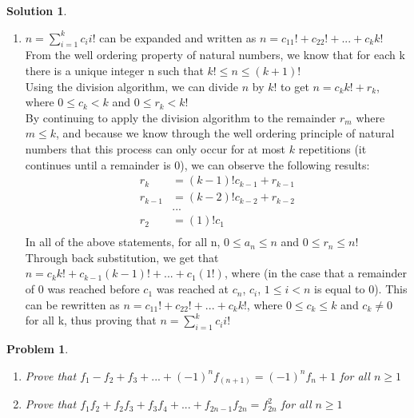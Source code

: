 \documentclass{article}
\newtheorem{problem}{Problem}
\theoremstyle{definition}
\newtheorem*{solution}{Solution}
\begin{document}
\begin{solution}
\begin{enumerate}[label = \alph*)]
    \item
    $n=\sum_{i=1}^k c_i i!$ can be expanded and written as $n=c_11!+c_22!+...+c_kk!$\\
    From the well ordering property of natural numbers, we know that for each k there is a unique integer n such that $k!\le n \le (k+1)!$\\
    Using the division algorithm, we can divide $n$ by $k!$ to get $n=c_kk! + r_k$, where $0\le c_k<k$ and $0\le r_k <k!$\\
    By continuing to apply the division algorithm to the remainder $r_m$ where $m\le k$, and because we know through the well ordering principle of natural numbers that this process can only occur for at most $k$ repetitions (it continues until a remainder is 0), we can observe the following results:
    \begin{align*}
        r_k &= (k-1)!c_{k-1}+r_{k-1}\\
        r_{k-1}&=(k-2)!c_{k-2}+r_{k-2}\\
        &...\\
        r_{2}&=(1)!c_1\\
    \end{align*}
    In all of the above statements, for all n, $0\le a_n\le n$ and $0 \le r_n \le n!$\\
    Through back substitution, we get that $n=c_kk!+c_{k-1}(k-1)!+...+c_1(1!)$, where (in the case that a remainder of 0 was reached before $c_1$ was reached at $c_n$, $c_i$, $1\le i <n$ is equal to 0). This can be rewritten as $n=c_11!+c_22!+...+c_kk!$, where $0\le c_k \le k$ and $c_k\ne 0$ for all k, thus proving that $n=\sum_{i=1}^k c_i i!$
\end{enumerate}
\end{solution}

\begin{problem}\text{ \\}
\begin{enumerate}[label = \alph*)]
    \item Prove that $f_1 - f_2 + f_3 + ... + (-1)^n f_(n+1) = (-1)^n f_n +1$ for all $n\ge 1$
    
    \item Prove that $f_1f_2 + f_2f_3 + f_3f_4 + ... + f_{2n-1}f_{2n} = f_{2n}^2$ for all $n\ge 1$
\end{enumerate}
\end{problem}
\end{document}

